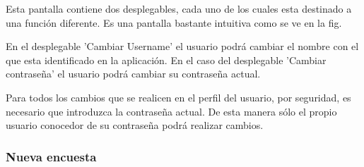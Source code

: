 \documentclass[a4paper, 12pt]{book}
\begin{document}
Esta pantalla contiene dos desplegables, cada uno de los cuales esta destinado a una funci\'on
diferente. Es una pantalla bastante intuitiva como se ve en la fig.

En el desplegable 'Cambiar Username' el usuario podr\'a cambiar el nombre con el que esta
identificado en la aplicaci\'on. En el caso del desplegable 'Cambiar contrase\~na' el usuario podr\'a
cambiar su contrase\~na actual.

Para todos los cambios que se realicen en el perfil del usuario, por seguridad, es necesario
que introduzca la contrase\~na actual. De esta manera s\'olo el propio usuario conocedor de su
contrase\~na podr\'a realizar cambios.


\subsubsection{Nueva encuesta}
\label{sec:nueva_encuesta}
\end{document}
